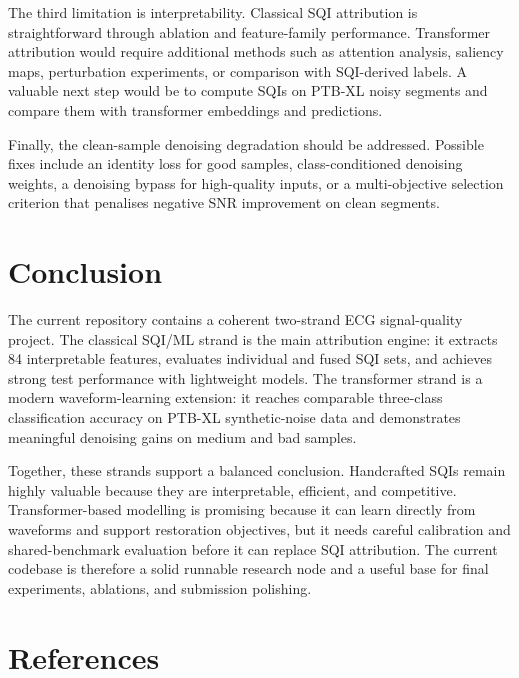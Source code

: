 \documentclass[11pt,a4paper]{article}
\begin{document}
The third limitation is interpretability. Classical SQI attribution is straightforward through ablation and feature-family performance. Transformer attribution would require additional methods such as attention analysis, saliency maps, perturbation experiments, or comparison with SQI-derived labels. A valuable next step would be to compute SQIs on PTB-XL noisy segments and compare them with transformer embeddings and predictions.

Finally, the clean-sample denoising degradation should be addressed. Possible fixes include an identity loss for good samples, class-conditioned denoising weights, a denoising bypass for high-quality inputs, or a multi-objective selection criterion that penalises negative SNR improvement on clean segments.

\section{Conclusion}

The current repository contains a coherent two-strand ECG signal-quality project. The classical SQI/ML strand is the main attribution engine: it extracts 84 interpretable features, evaluates individual and fused SQI sets, and achieves strong test performance with lightweight models. The transformer strand is a modern waveform-learning extension: it reaches comparable three-class classification accuracy on PTB-XL synthetic-noise data and demonstrates meaningful denoising gains on medium and bad samples.

Together, these strands support a balanced conclusion. Handcrafted SQIs remain highly valuable because they are interpretable, efficient, and competitive. Transformer-based modelling is promising because it can learn directly from waveforms and support restoration objectives, but it needs careful calibration and shared-benchmark evaluation before it can replace SQI attribution. The current codebase is therefore a solid runnable research node and a useful base for final experiments, ablations, and submission polishing.

\section*{References}
\end{document}
